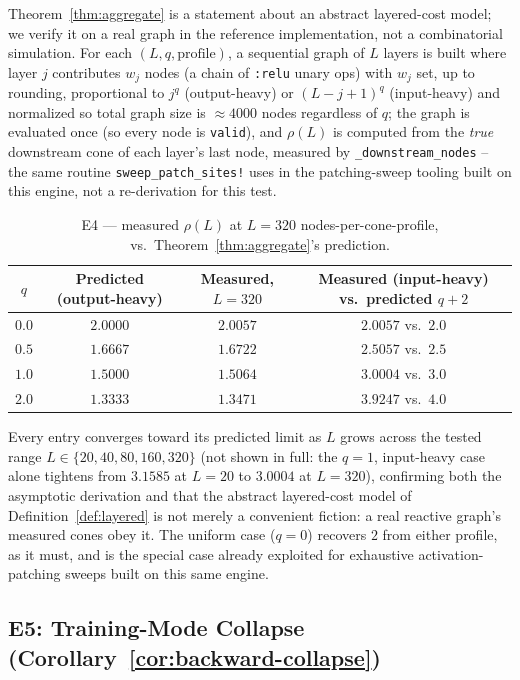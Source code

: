 \documentclass[11pt,a4paper]{article}
\begin{document}
Theorem~\ref{thm:aggregate} is a statement about an abstract layered-cost model; we verify it on
a real graph in the reference implementation, not a combinatorial simulation. For each
$(L, q, \text{profile})$, a sequential graph of $L$ layers is built where layer $j$ contributes
$w_j$ nodes (a chain of \texttt{:relu} unary ops) with $w_j$ set, up to rounding, proportional to
$j^q$ (output-heavy) or $(L{-}j{+}1)^q$ (input-heavy) and normalized so total graph size is
$\approx 4000$ nodes regardless of $q$; the graph is evaluated once (so every node is
\texttt{valid}), and $\rho(L)$ is computed from the \emph{true} downstream cone of each layer's
last node, measured by \texttt{\_downstream\_nodes} -- the same routine
\texttt{sweep\_patch\_sites!} uses in the patching-sweep tooling built on this engine, not a
re-derivation for this test.

\begin{table}[htbp]
\centering
\caption{E4 --- measured $\rho(L)$ at $L=320$ nodes-per-cone-profile, vs.\ Theorem~\ref{thm:aggregate}'s prediction.}
\label{tab:e4}
\begin{tabular}{c c c c}
\toprule
$q$ & Predicted (output-heavy) & Measured, $L{=}320$ & Measured (input-heavy) vs.\ predicted $q{+}2$ \\
\midrule
$0.0$ & $2.0000$ & $2.0057$ & $2.0057$ vs.\ $2.0$ \\
$0.5$ & $1.6667$ & $1.6722$ & $2.5057$ vs.\ $2.5$ \\
$1.0$ & $1.5000$ & $1.5064$ & $3.0004$ vs.\ $3.0$ \\
$2.0$ & $1.3333$ & $1.3471$ & $3.9247$ vs.\ $4.0$ \\
\bottomrule
\end{tabular}
\end{table}

Every entry converges toward its predicted limit as $L$ grows across the tested range
$L\in\{20,40,80,160,320\}$ (not shown in full: the $q{=}1$, input-heavy case alone tightens from
$3.1585$ at $L{=}20$ to $3.0004$ at $L{=}320$), confirming both the asymptotic derivation and that
the abstract layered-cost model of Definition~\ref{def:layered} is not merely a convenient
fiction: a real reactive graph's measured cones obey it. The uniform case ($q=0$) recovers $2$
from either profile, as it must, and is the special case already exploited for exhaustive
activation-patching sweeps built on this same engine.

\subsection{E5: Training-Mode Collapse (Corollary~\ref{cor:backward-collapse})}
\label{sec:e5}
\end{document}
